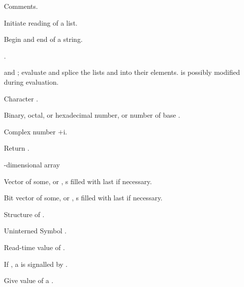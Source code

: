 \begin{LIST}{1cm}

  {
  Comments.
  }

  \IT{\KWD*{(}}
  {
  Initiate reading of a list.
  }

  {
  Begin and end of a string.
  }

  {
   .
  }

  {
    and ; evaluate  and splice the lists
   and  into their
  elements.  is possibly modified during evaluation.
  }

  {
  Character .
  }

  {
  Binary, octal, or hexadecimal number, or number of base . 
  }

  {Complex number $+$i.
  }

  {
  Return .
  }

  {
  -dimensional array
  }

  {
  \index{\#(}%
  Vector of some, or ,
  s filled with last  if necessary.
  }

  {
  \index{\#*}%
  Bit vector of some, or ,
  s filled with last  if necessary.
  }

  {
  Structure of .
  }

  {
  Uninterned Symbol .
  }

  {
  Read-time value of .
  }

  {
  If \NIL, a  is signalled by .
  }

  {
  \index{\#=}%
  Give value of  a .
  }


\end{LIST}
